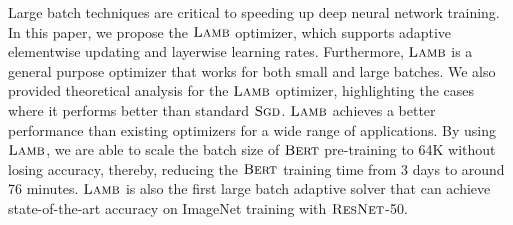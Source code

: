 Large batch techniques are critical to speeding up deep neural network training. In this paper, we propose the $\textsc{Lamb}$ optimizer, which supports adaptive elementwise updating and layerwise learning rates. Furthermore, $\textsc{Lamb}$ is a general purpose optimizer that works for both small and large batches. We also provided theoretical analysis for the $\textsc{Lamb}$ optimizer, highlighting the cases where it performs better than standard $\textsc{Sgd}$. $\textsc{Lamb}$ achieves a better performance than existing optimizers for a wide range of applications.  By using $\textsc{Lamb}$, we are able to scale the batch size of $\textsc{Bert}$ pre-training to 64K without losing accuracy, thereby, reducing the $\textsc{Bert}$ training time from 3 days to around 76 minutes. $\textsc{Lamb}$ is also the first large batch adaptive solver that can achieve state-of-the-art accuracy on ImageNet training with $\textsc{ResNet}$-50.